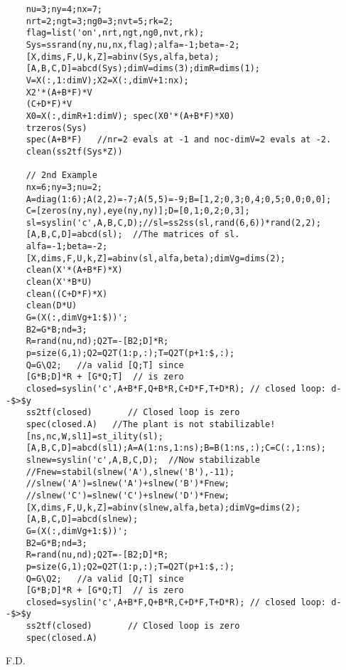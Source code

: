 \begin{examples}
  \begin{Verbatim}
    nu=3;ny=4;nx=7;
    nrt=2;ngt=3;ng0=3;nvt=5;rk=2;
    flag=list('on',nrt,ngt,ng0,nvt,rk);
    Sys=ssrand(ny,nu,nx,flag);alfa=-1;beta=-2;
    [X,dims,F,U,k,Z]=abinv(Sys,alfa,beta);
    [A,B,C,D]=abcd(Sys);dimV=dims(3);dimR=dims(1);
    V=X(:,1:dimV);X2=X(:,dimV+1:nx);
    X2'*(A+B*F)*V
    (C+D*F)*V
    X0=X(:,dimR+1:dimV); spec(X0'*(A+B*F)*X0)
    trzeros(Sys)
    spec(A+B*F)   //nr=2 evals at -1 and noc-dimV=2 evals at -2.
    clean(ss2tf(Sys*Z))

    // 2nd Example
    nx=6;ny=3;nu=2;
    A=diag(1:6);A(2,2)=-7;A(5,5)=-9;B=[1,2;0,3;0,4;0,5;0,0;0,0];
    C=[zeros(ny,ny),eye(ny,ny)];D=[0,1;0,2;0,3];
    sl=syslin('c',A,B,C,D);//sl=ss2ss(sl,rand(6,6))*rand(2,2);
    [A,B,C,D]=abcd(sl);  //The matrices of sl.
    alfa=-1;beta=-2;
    [X,dims,F,U,k,Z]=abinv(sl,alfa,beta);dimVg=dims(2);
    clean(X'*(A+B*F)*X)
    clean(X'*B*U)
    clean((C+D*F)*X)
    clean(D*U)
    G=(X(:,dimVg+1:$))';
    B2=G*B;nd=3;
    R=rand(nu,nd);Q2T=-[B2;D]*R;
    p=size(G,1);Q2=Q2T(1:p,:);T=Q2T(p+1:$,:);
    Q=G\Q2;   //a valid [Q;T] since 
    [G*B;D]*R + [G*Q;T]  // is zero
    closed=syslin('c',A+B*F,Q+B*R,C+D*F,T+D*R); // closed loop: d--$>$y
    ss2tf(closed)       // Closed loop is zero
    spec(closed.A)   //The plant is not stabilizable!
    [ns,nc,W,sl1]=st_ility(sl);
    [A,B,C,D]=abcd(sl1);A=A(1:ns,1:ns);B=B(1:ns,:);C=C(:,1:ns);
    slnew=syslin('c',A,B,C,D);  //Now stabilizable
    //Fnew=stabil(slnew('A'),slnew('B'),-11);
    //slnew('A')=slnew('A')+slnew('B')*Fnew;
    //slnew('C')=slnew('C')+slnew('D')*Fnew;
    [X,dims,F,U,k,Z]=abinv(slnew,alfa,beta);dimVg=dims(2);
    [A,B,C,D]=abcd(slnew);
    G=(X(:,dimVg+1:$))';
    B2=G*B;nd=3;
    R=rand(nu,nd);Q2T=-[B2;D]*R;
    p=size(G,1);Q2=Q2T(1:p,:);T=Q2T(p+1:$,:);
    Q=G\Q2;   //a valid [Q;T] since 
    [G*B;D]*R + [G*Q;T]  // is zero
    closed=syslin('c',A+B*F,Q+B*R,C+D*F,T+D*R); // closed loop: d--$>$y
    ss2tf(closed)       // Closed loop is zero
    spec(closed.A)
  \end{Verbatim}
\end{examples}
\begin{manseealso}
     
     
\end{manseealso}
\begin{authors}
  F.D.  
\end{authors}

